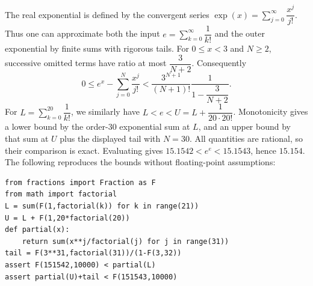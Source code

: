 The real exponential is defined by the convergent series $\exp(x)=\sum_{j=0}^{\infty}\dfrac{x^j}{j!}$. Thus one can approximate both the input $e=\sum_{k=0}^{\infty}\dfrac{1}{k!}$ and the outer exponential by finite sums with rigorous tails.
For $0\le x<3$ and $N\ge2$, successive omitted terms have ratio at most $\dfrac{3}{N+2}$. Consequently
\[0\le e^x-\sum_{j=0}^N\dfrac{x^j}{j!}<\dfrac{3^{N+1}}{(N+1)!}\dfrac{1}{1-\dfrac{3}{N+2}}.\]
For $L=\sum_{k=0}^{20}\dfrac{1}{k!}$, we similarly have $L<e<U=L+\dfrac{1}{20\cdot20!}$. Monotonicity gives a lower bound by the order-$30$ exponential sum at $L$, and an upper bound by that sum at $U$ plus the displayed tail with $N=30$. All quantities are rational, so their comparison is exact. Evaluating gives $15.1542<e^e<15.1543$, hence $\boxed{15.154}$. The following reproduces the bounds without floating-point assumptions:
\begin{verbatim}
from fractions import Fraction as F
from math import factorial
L = sum(F(1,factorial(k)) for k in range(21))
U = L + F(1,20*factorial(20))
def partial(x):
    return sum(x**j/factorial(j) for j in range(31))
tail = F(3**31,factorial(31))/(1-F(3,32))
assert F(151542,10000) < partial(L)
assert partial(U)+tail < F(151543,10000)
\end{verbatim}
